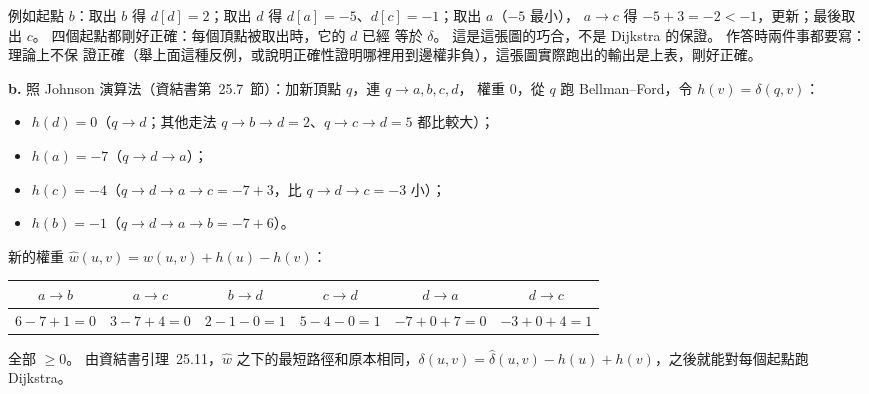 \begin{pastsoln}
例如起點 $b$：取出 $b$ 得 $d[d] = 2$；取出 $d$ 得 $d[a] = -5$、$d[c] = -1$；取出 $a$（$-5$ 最小），
$a \to c$ 得 $-5 + 3 = -2 < -1$，更新；最後取出 $c$。 四個起點都剛好正確：每個頂點被取出時，它的 $d$ 已經
等於 $\delta$。 這是這張圖的巧合，不是 Dijkstra 的保證。 作答時兩件事都要寫：理論上不保
證正確（舉上面這種反例，或說明正確性證明哪裡用到邊權非負），這張圖實際跑出的輸出是上表，剛好正確。

\textbf{b.} 照 Johnson 演算法（資結書第~25.7~節）：加新頂點 $q$，連 $q \to a, b, c, d$，
權重 $0$，從 $q$ 跑 Bellman--Ford，令 $h(v) = \delta(q, v)$：
\begin{itemize}
\item $h(d) = 0$（$q \to d$；其他走法 $q \to b \to d = 2$、$q \to c \to d = 5$ 都比較大）；
\item $h(a) = -7$（$q \to d \to a$）；
\item $h(c) = -4$（$q \to d \to a \to c = -7 + 3$，比 $q \to d \to c = -3$ 小）；
\item $h(b) = -1$（$q \to d \to a \to b = -7 + 6$）。
\end{itemize}
新的權重 $\hat{w}(u, v) = w(u, v) + h(u) - h(v)$：
\begin{center}
\small
\begin{tabular}{cccccc}
\toprule
$a \to b$ & $a \to c$ & $b \to d$ & $c \to d$ & $d \to a$ & $d \to c$ \\
\midrule
$6 - 7 + 1 = 0$ & $3 - 7 + 4 = 0$ & $2 - 1 - 0 = 1$ & $5 - 4 - 0 = 1$ & $-7 + 0 + 7 = 0$ & $-3 + 0 + 4 = 1$ \\
\bottomrule
\end{tabular}
\end{center}
全部 $\ge 0$。 由資結書引理~25.11，$\hat{w}$ 之下的最短路徑和原本相同，$\delta(u, v) =
\hat{\delta}(u, v) - h(u) + h(v)$，之後就能對每個起點跑 Dijkstra。


\end{pastsoln}
